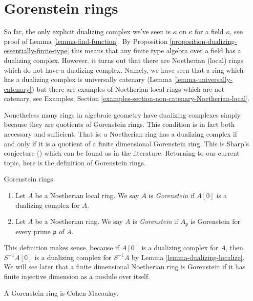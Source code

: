 \section{Gorenstein rings}
\label{section-gorenstein}

\noindent
So far, the only explicit dualizing complex we've seen is $\kappa$ on $\kappa$
for a field $\kappa$, see proof of Lemma \ref{lemma-find-function}.
By Proposition \ref{proposition-dualizing-essentially-finite-type}
this means that any finite type algebra over a field has a dualizing
complex. However, it turns out that there are Noetherian (local) rings
which do not have a dualizing complex. Namely, we have seen that
a ring which has a dualizing complex is universally catenary
(Lemma \ref{lemma-universally-catenary})
but there are examples of
Noetherian local rings which are not catenary, see
Examples, Section \ref{examples-section-non-catenary-Noetherian-local}.

\medskip\noindent
Nonetheless many rings in algebraic geometry have dualizing complexes
simply because they are quotients of Gorenstein rings. This condition
is in fact both necessary and sufficient. That is: a Noetherian ring
has a dualizing complex if and only if it is a quotient of a finite
dimensional Gorenstein ring. This is Sharp's conjecture (\cite{Sharp})
which can be found as \cite[Corollary 1.4]{Kawasaki} in the literature.
Returning to our current topic, here is the definition of Gorenstein rings.

\begin{definition}
\label{definition-gorenstein}
Gorenstein rings.
\begin{enumerate}
\item Let $A$ be a Noetherian local ring. We say $A$ is {\it Gorenstein}
if $A[0]$ is a dualizing complex for $A$.
\item Let $A$ be a Noetherian ring. We say $A$ is {\it Gorenstein}
if $A_\mathfrak p$ is Gorenstein for every prime $\mathfrak p$ of $A$.
\end{enumerate}
\end{definition}

\noindent
This definition makes sense, because if $A[0]$ is a dualizing complex
for $A$, then $S^{-1}A[0]$ is a dualizing complex for $S^{-1}A$ by
Lemma \ref{lemma-dualizing-localize}.
We will see later that a finite dimensional Noetherian ring is Gorenstein
if it has finite injective dimension as a module over itself.

\begin{lemma}
\label{lemma-gorenstein-CM}
A Gorenstein ring is Cohen-Macaulay.
\end{lemma}

